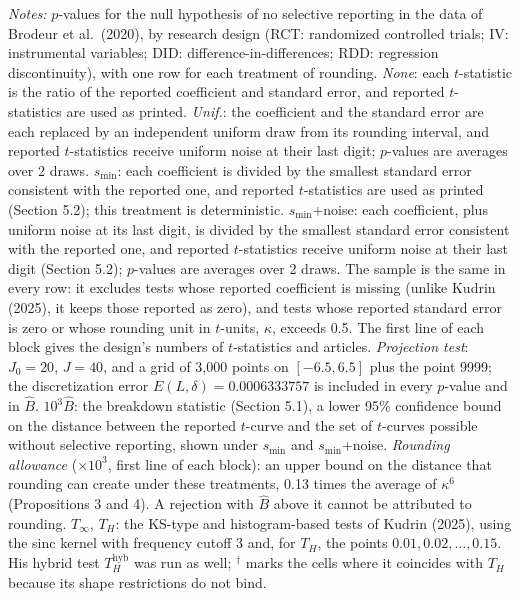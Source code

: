 \begin{table}[htbp]
\medskip
\begin{minipage}{\linewidth}
\footnotesize
\textit{Notes:} $p$-values for the null hypothesis of no selective reporting in the data of Brodeur et al.\ (2020), by research design (RCT: randomized controlled trials; IV: instrumental variables; DID: difference-in-differences; RDD: regression discontinuity), with one row for each treatment of rounding.
\textit{None}: each $t$-statistic is the ratio of the reported coefficient and standard error, and reported $t$-statistics are used as printed.
\textit{Unif.}: the coefficient and the standard error are each replaced by an independent uniform draw from its rounding interval, and reported $t$-statistics receive uniform noise at their last digit; $p$-values are averages over 2 draws.
$s_{\min}$: each coefficient is divided by the smallest standard error consistent with the reported one, and reported $t$-statistics are used as printed (Section 5.2); this treatment is deterministic.
$s_{\min}$+noise: each coefficient, plus uniform noise at its last digit, is divided by the smallest standard error consistent with the reported one, and reported $t$-statistics receive uniform noise at their last digit (Section 5.2); $p$-values are averages over 2 draws.
The sample is the same in every row: it excludes tests whose reported coefficient is missing (unlike Kudrin (2025), it keeps those reported as zero), and tests whose reported standard error is zero or whose rounding unit in $t$-units, $\kappa$, exceeds 0.5. The first line of each block gives the design's numbers of $t$-statistics and articles.
\textit{Projection test}: $J_0=20$, $J=40$, and a grid of 3,000 points on $[-6.5,6.5]$ plus the point 9999; the discretization error $E(L,\delta)=0.0006333757$ is included in every $p$-value and in $\widehat{B}$.
$10^3\widehat{B}$: the breakdown statistic (Section 5.1), a lower 95\% confidence bound on the distance between the reported $t$-curve and the set of $t$-curves possible without selective reporting, shown under $s_{\min}$ and $s_{\min}$+noise. \textit{Rounding allowance} ($\times 10^3$, first line of each block): an upper bound on the distance that rounding can create under these treatments, 0.13 times the average of $\kappa^6$ (Propositions 3 and 4). A rejection with $\widehat{B}$ above it cannot be attributed to rounding.
$T_\infty$, $T_H$: the KS-type and histogram-based tests of Kudrin (2025), using the sinc kernel with frequency cutoff 3 and, for $T_H$, the points $0.01,0.02,\ldots,0.15$. His hybrid test $T_H^{\mathrm{hyb}}$ was run as well; $^\dagger$ marks the cells where it coincides with $T_H$ because its shape restrictions do not bind.

\end{minipage}
\end{table}
